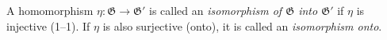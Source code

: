 A homomorphism $\eta: \mathfrak{G} \to \mathfrak{G}'$ is called an \textit{isomorphism of $\mathfrak{G}$ into $\mathfrak{G}'$} if $\eta$ is injective (1--1). If $\eta$ is also surjective (onto), it is called an \textit{isomorphism onto}.
